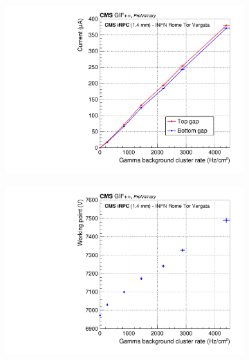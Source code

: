 	\begin{figure}[H]
		\begin{subfigure}{.5\linewidth}
		    \centering
			\includegraphics[width = \linewidth]{fig/chapt6/CMS-iRPC-INFN-Current_vs_Rate.pdf}
			\caption{\label{fig:iRPC_INFN_perf:A}}
		\end{subfigure}
		\begin{subfigure}{.5\linewidth}
		    \centering
			\includegraphics[width = \linewidth]{fig/chapt6/CMS-iRPC-INFN-WorkingPoint_vs_Rate.pdf}
			\caption{\label{fig:iRPC_INFN_perf:B}}
		\end{subfigure}
		\begin{subfigure}{.5\linewidth}
		    \centering

\end{subfigure}
\end{figure}

